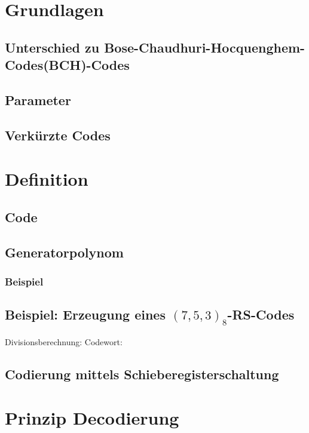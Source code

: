 \section{Grundlagen}
\subsection{Unterschied zu Bose-Chaudhuri-Hocquenghem-Codes(BCH)-Codes}
\subsection{Parameter}
\subsection{Verkürzte Codes}
\section{Definition}
\subsection{Code}
\subsection{Generatorpolynom}
\subsubsection*{Beispiel}
\subsection{Beispiel: Erzeugung eines \texorpdfstring{$(7,5,3)_8$}{(7,5,3)\_8}-RS-Codes}
Divisionsberechnung:
Codewort:

\subsection{Codierung mittels Schieberegisterschaltung}

\section{Prinzip Decodierung}
